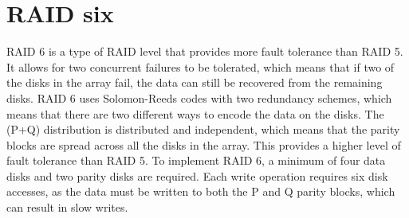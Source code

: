 \section{RAID six}

RAID 6 is a type of RAID level that provides more fault tolerance than RAID 5. 
It allows for two concurrent failures to be tolerated, which means that if two of the disks in the array fail, the data can still be recovered from the remaining disks. 
RAID 6 uses Solomon-Reeds codes with two redundancy schemes, which means that there are two different ways to encode the data on the disks. 
The (P+Q) distribution is distributed and independent, which means that the parity blocks are spread across all the disks in the array. 
This provides a higher level of fault tolerance than RAID 5. To implement RAID 6, a minimum of four data disks and two parity disks are required. 
Each write operation requires six disk accesses, as the data must be written to both the P and Q parity blocks, which can result in slow writes.